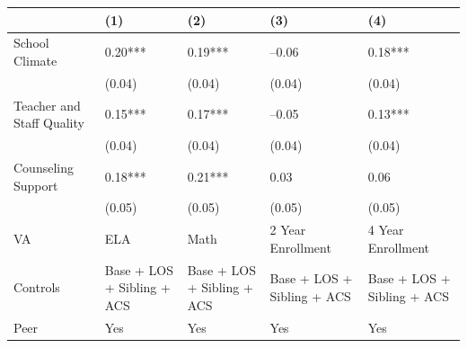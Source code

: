 \begin{table}[tbp] \centering
{}

{\footnotesize
\begin{tabularx}{\linewidth}{lCCCC}

\toprule
&{(1)}&{(2)}&{(3)}&{(4)} \tabularnewline
\midrule \addlinespace[\belowrulesep]
School Climate&0.20***&0.19***&--0.06&0.18*** \tabularnewline
&(0.04)&(0.04)&(0.04)&(0.04) \tabularnewline
Teacher and Staff Quality&0.15***&0.17***&--0.05&0.13*** \tabularnewline
&(0.04)&(0.04)&(0.04)&(0.04) \tabularnewline
Counseling Support&0.18***&0.21***&0.03&0.06 \tabularnewline
&(0.05)&(0.05)&(0.05)&(0.05) \tabularnewline
\midrule VA&ELA&Math&2 Year Enrollment&4 Year Enrollment \tabularnewline
Controls&Base + LOS + Sibling + ACS&Base + LOS + Sibling + ACS&Base + LOS + Sibling + ACS&Base + LOS + Sibling + ACS \tabularnewline
Peer&Yes&Yes&Yes&Yes \tabularnewline
\bottomrule 

\end{tabularx}
}
\end{table}
